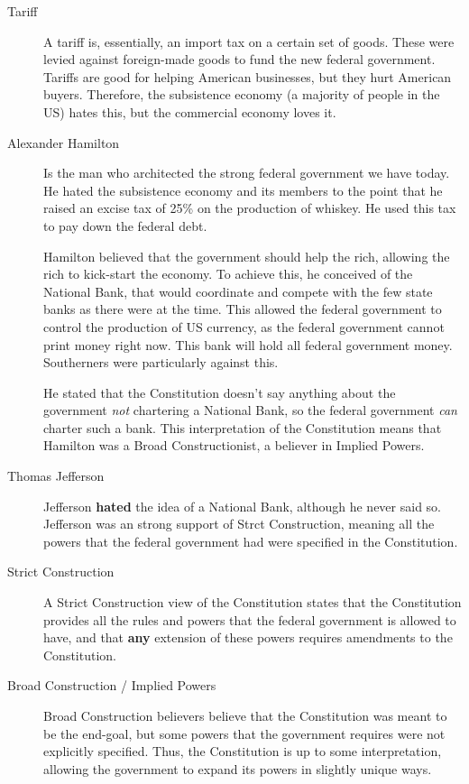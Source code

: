 \begin{description}
\item[Tariff] A tariff is, essentially, an import tax on a certain set of goods.
  These were levied against foreign-made goods to fund the new federal government.
  Tariffs are good for helping American businesses, but they hurt American buyers.
  Therefore, the subsistence economy (a majority of people in the US) hates this, but the commercial economy loves it.

\item[Alexander Hamilton] Is the man who architected the strong federal government we have today.
  He hated the subsistence economy and its members to the point that he raised an excise tax of 25\% on the production of whiskey.
  He used this tax to pay down the federal debt.

  Hamilton believed that the government should help the rich, allowing the rich to kick-start the economy.
  To achieve this, he conceived of the National Bank, that would coordinate and compete with the few state banks as there were at the time.
  This allowed the federal government to control the production of US currency, as the federal government cannot print money right now.
  This bank will hold all federal government money.
  Southerners were particularly against this.

  He stated that the Constitution doesn't say anything about the government \textit{not} chartering a National Bank, so the federal government \textit{can} charter such a bank.
  This interpretation of the Constitution means that Hamilton was a Broad Constructionist, a believer in Implied Powers.

\item[Thomas Jefferson] Jefferson \textbf{hated} the idea of a National Bank, although he never said so.
  Jefferson was an strong support of Strct Construction, meaning all the powers that the federal government had were specified in the Constitution.

\item[Strict Construction] A Strict Construction view of the Constitution states that the Constitution provides all the rules and powers that the federal government is allowed to have, and that \textbf{any} extension of these powers requires amendments to the Constitution.

\item[Broad Construction / Implied Powers] Broad Construction believers believe that the Constitution was meant to be the end-goal, but some powers that the government requires were not explicitly specified.
  Thus, the Constitution is up to some interpretation, allowing the government to expand its powers in slightly unique ways.


\end{description}
